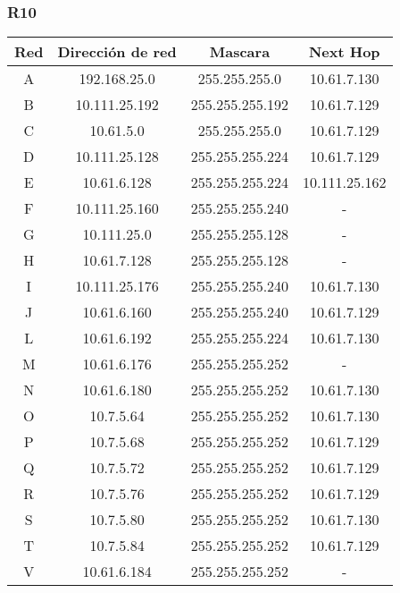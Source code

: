 \subsubsection{R10}
\begin{table}[!htbp]
\centering
  \begin{tabular}{|c|c|c|c|}
  \hline
Red & Dirección de red & Mascara & Next Hop\\ \hline
A & 192.168.25.0 & 255.255.255.0 &10.61.7.130 \\ \hline
B & 10.111.25.192 & 255.255.255.192 &10.61.7.129 \\ \hline
C & 10.61.5.0 & 255.255.255.0 &10.61.7.129 \\ \hline
D & 10.111.25.128 & 255.255.255.224 &10.61.7.129 \\ \hline
E & 10.61.6.128 & 255.255.255.224 &10.111.25.162 \\ \hline
F & 10.111.25.160 & 255.255.255.240 & -\\ \hline
G & 10.111.25.0 & 255.255.255.128 & -\\ \hline
H & 10.61.7.128 & 255.255.255.128 &- \\ \hline
I & 10.111.25.176 & 255.255.255.240 &10.61.7.130 \\ \hline
J & 10.61.6.160 & 255.255.255.240 & 10.61.7.129 \\ \hline
L & 10.61.6.192 & 255.255.255.224 & 10.61.7.130 \\ \hline
M & 10.61.6.176 & 255.255.255.252 & -\\ \hline
N & 10.61.6.180 & 255.255.255.252 &10.61.7.130 \\ \hline
O & 10.7.5.64 & 255.255.255.252 &10.61.7.130 \\ \hline
P & 10.7.5.68 & 255.255.255.252 &10.61.7.129 \\ \hline
Q & 10.7.5.72 & 255.255.255.252 &10.61.7.129 \\ \hline
R & 10.7.5.76 & 255.255.255.252 &10.61.7.129 \\ \hline
S & 10.7.5.80 & 255.255.255.252 &10.61.7.130 \\ \hline
T & 10.7.5.84 & 255.255.255.252 & 10.61.7.129 \\ \hline
V & 10.61.6.184 & 255.255.255.252 & -\\
  \hline
 \end{tabular}
\end{table}

\newpage
